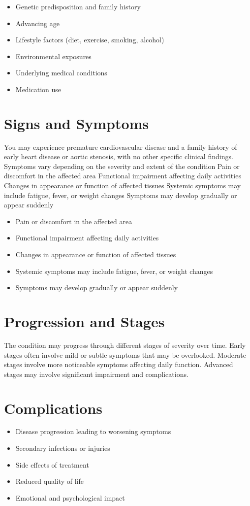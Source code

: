 \begin{itemize}[noitemsep]
  \item Genetic predisposition and family history
  \item Advancing age
  \item Lifestyle factors (diet, exercise, smoking, alcohol)
  \item Environmental exposures
  \item Underlying medical conditions
  \item Medication use
\end{itemize}
\section{Signs and Symptoms}
You may experience premature cardiovascular disease and a family history of early heart disease or aortic stenosis, with no other specific clinical findings. Symptoms vary depending on the severity and extent of the condition Pain or discomfort in the affected area Functional impairment affecting daily activities Changes in appearance or function of affected tissues Systemic symptoms may include fatigue, fever, or weight changes Symptoms may develop gradually or appear suddenly

\begin{itemize}[noitemsep]
  \item Pain or discomfort in the affected area
  \item Functional impairment affecting daily activities
  \item Changes in appearance or function of affected tissues
  \item Systemic symptoms may include fatigue, fever, or weight changes
  \item Symptoms may develop gradually or appear suddenly
\end{itemize}
\section{Progression and Stages}
The condition may progress through different stages of severity over time. Early stages often involve mild or subtle symptoms that may be overlooked. Moderate stages involve more noticeable symptoms affecting daily function. Advanced stages may involve significant impairment and complications.
\section{Complications}
\begin{itemize}[noitemsep]
  \item Disease progression leading to worsening symptoms
  \item Secondary infections or injuries
  \item Side effects of treatment
  \item Reduced quality of life
  \item Emotional and psychological impact
\end{itemize}
